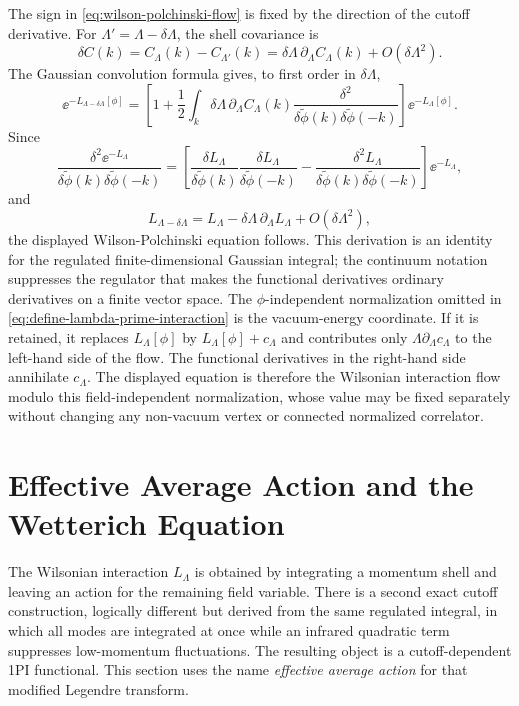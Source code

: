 The sign in \eqref{eq:wilson-polchinski-flow} is fixed by the direction of the
cutoff derivative.  For \(\Lambda'=\Lambda-\delta\Lambda\), the shell covariance
is
\[
  \delta C(k)
  =
  C_\Lambda(k)-C_{\Lambda'}(k)
  =
  \delta\Lambda\,\partial_\Lambda C_\Lambda(k)+O(\delta\Lambda^2).
\]
The Gaussian convolution formula gives, to first order in \(\delta\Lambda\),
\[
  \ee^{-L_{\Lambda-\delta\Lambda}[\phi]}
  =
  \left[
    1+
    \frac12\int_k
    \delta\Lambda\,\partial_\Lambda C_\Lambda(k)
    \frac{\delta^2}
      {\delta\widetilde\phi(k)\delta\widetilde\phi(-k)}
  \right]
  \ee^{-L_\Lambda[\phi]} .
\]
Since
\[
  \frac{\delta^2\ee^{-L_\Lambda}}
    {\delta\widetilde\phi(k)\delta\widetilde\phi(-k)}
  =
  \left[
    \frac{\delta L_\Lambda}{\delta\widetilde\phi(k)}
    \frac{\delta L_\Lambda}{\delta\widetilde\phi(-k)}
    -
    \frac{\delta^2L_\Lambda}
      {\delta\widetilde\phi(k)\delta\widetilde\phi(-k)}
  \right]\ee^{-L_\Lambda},
\]
and
\[
  L_{\Lambda-\delta\Lambda}
  =
  L_\Lambda-\delta\Lambda\,\partial_\Lambda L_\Lambda+O(\delta\Lambda^2),
\]
the displayed Wilson-Polchinski equation follows.  This derivation is an
identity for the regulated finite-dimensional Gaussian integral; the continuum
notation suppresses the regulator that makes the functional derivatives
ordinary derivatives on a finite vector space.
The \(\phi\)-independent normalization omitted in
\eqref{eq:define-lambda-prime-interaction} is the vacuum-energy coordinate.
If it is retained, it replaces \(L_\Lambda[\phi]\) by
\(L_\Lambda[\phi]+c_\Lambda\) and contributes only
\(\Lambda\partial_\Lambda c_\Lambda\) to the left-hand side of the flow.  The
functional derivatives in the right-hand side annihilate \(c_\Lambda\).  The
displayed equation is therefore the Wilsonian interaction flow modulo this
field-independent normalization, whose value may be fixed separately without
changing any non-vacuum vertex or connected normalized correlator.

\section{Effective Average Action and the Wetterich Equation}
\label{sec:effective-average-action-wetterich}

The Wilsonian interaction \(L_\Lambda\) is obtained by integrating a momentum
shell and leaving an action for the remaining field variable.  There is a
second exact cutoff construction, logically different but derived from the
same regulated integral, in which all modes are integrated at once while an
infrared quadratic term suppresses low-momentum fluctuations.  The resulting
object is a cutoff-dependent 1PI functional.  This section uses the name
\emph{effective average action} for that modified Legendre transform.

